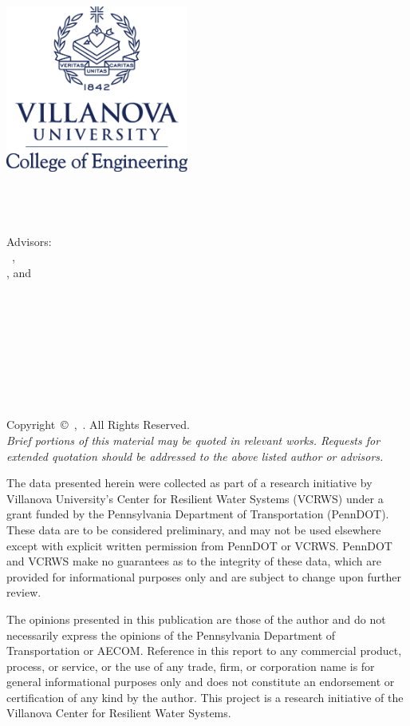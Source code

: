 \hfill
\vfill
{
	{\centering

	\includegraphics[width=6cm]{gfx/VULogo} \\[5mm]
	
	}
	\vfill
	
	\small
	\textbf{\thesisName} \\
	\textit{\thesisTitle} \\
	\thesisDate \\
	Advisors: \\
	\thesisFirstReviewer\ , \\
	\thesisSecondReviewer , and\\
	\thesisThirdReviewer \\
	\\
	\textbf{\thesisUniversity} \\
	\textit{\thesisUniversityGroup} \\
	\thesisUniversityInstitute \\
	\thesisUniversityDepartment \\
	\thesisUniversityStreetAddress \\
	\thesisUniversityCity\ \thesisUniversityPostalCode\ 
}
\clearpage
\hfill
{
	\vfill
	{\centering	
	
	Copyright~\copyright~\thesisName,~\thesisDate. All Rights Reserved. \\
	\textit{Brief portions of this material may be quoted in relevant works. Requests for extended quotation should be addressed to the above listed author or advisors.} \\
	
	}
	\vfill
	The data presented herein were collected as part of a research initiative by Villanova University's Center for Resilient Water Systems (VCRWS) under a grant funded by the Pennsylvania Department of Transportation (PennDOT). These data are to be considered preliminary, and may not be used elsewhere except with explicit written permission from PennDOT or VCRWS. PennDOT and VCRWS make no guarantees as to the integrity of these data, which are provided for informational purposes only and are subject to change upon further review.

	The opinions presented in this publication are those of the author and do not necessarily express the opinions of the Pennsylvania Department of Transportation or AECOM. Reference in this report to any commercial product, process, or service, or the use of any trade, firm, or corporation name is for general informational purposes only and does not constitute an endorsement or certification of any kind by the author. This project is a research initiative of the Villanova Center for Resilient Water Systems.
	\vfill
}

